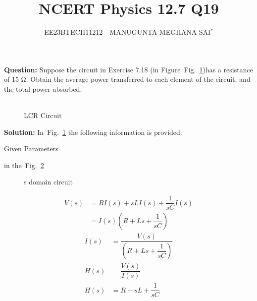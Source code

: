 \documentclass[journal,12pt,onecolumn]{IEEEtran}
\title{
	
\title{NCERT Physics 12.7 Q19}
\author{EE23BTECH11212 - MANUGUNTA MEGHANA SAI$^{*}$%
}


}
\newcommand\figref{Fig.~\ref}
\theoremstyle{remark}
\begin{document}
\maketitle

\textbf{Question:} 
Suppose the circuit in Exercise 7.18 (in Figure~\figref{fig:2})has a resistance of 15 Ω. Obtain the average power transferred to each element of the circuit, and the total power absorbed.\\
\\

\begin{figure}[h]
	\centering
	
	\caption{LCR Circuit}
	\label{fig:2}
\end{figure}
     
\textbf{Solution: }
In~\figref{fig:2} the following information is provided:
 
 

 \begin{table}[h!]
 	\centering
 	\resizebox{6 cm}{!}{
 		
 	}
 	\caption{Given Parameters}
 	\label{tab:my_label} 
 \end{table} 
  in the~\figref{fig:1}
 
 \begin{figure}[!h]
 	\centering
 	
 	\caption{s domain circuit}
 	\label{fig:1}
 	
 \end{figure}
 \begin{align}
 	V(s) &= R I(s) + sL I(s) + \dfrac{1}{sC} I(s)\\
         &= I(s)\left(R + Ls + \dfrac{1}{sC}\right)
 \end{align}
\begin{align}
    I(s) &= \dfrac{V(s)}{\left(R + Ls + \dfrac{1}{sC}\right)}\\ 
    H(s) &= \dfrac{V(s)}{I(s)}\\
	H(s) &= R + sL + \dfrac{1}{sC}
\end{align}
\end{document}
